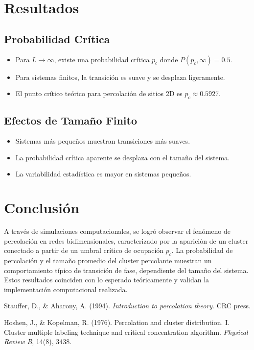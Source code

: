 \documentclass[10pt,twocolumn]{article}
\begin{document}
\section{Resultados}

\subsection*{Probabilidad Crítica}
\begin{itemize}
    \item Para $L \to \infty$, existe una probabilidad crítica $p_c$ donde $P(p_c, \infty) = 0.5$.
    \item Para sistemas finitos, la transición es suave y se desplaza ligeramente.
    \item El punto crítico teórico para percolación de sitios 2D es $p_c \approx 0.5927$.
\end{itemize}

\subsection*{Efectos de Tamaño Finito}
\begin{itemize}
    \item Sistemas más pequeños muestran transiciones más suaves.
    \item La probabilidad crítica aparente se desplaza con el tamaño del sistema.
    \item La variabilidad estadística es mayor en sistemas pequeños.
\end{itemize}
   
\section{Conclusión}
   A través de simulaciones computacionales, se logró observar el fenómeno de percolación en redes bidimensionales, caracterizado por la aparición de un cluster conectado a partir de un umbral crítico de ocupación \( p_c \). La probabilidad de percolación y el tamaño promedio del cluster percolante muestran un comportamiento típico de transición de fase, dependiente del tamaño del sistema. Estos resultados coinciden con lo esperado teóricamente y validan la implementación computacional realizada.
    
\begin{thebibliography}{99}

Stauffer, D., \& Aharony, A. (1994). \textit{Introduction to percolation theory}. CRC press.

Hoshen, J., \& Kopelman, R. (1976). Percolation and cluster distribution. I. Cluster multiple labeling technique and critical 
concentration algorithm. \textit{Physical Review B}, 14(8), 3438.

\end{thebibliography}
\end{document}
